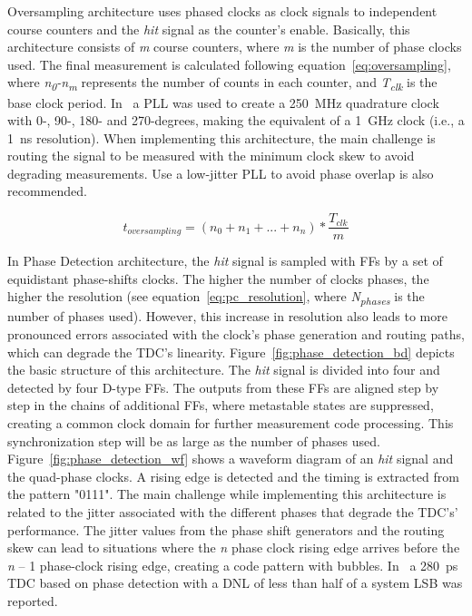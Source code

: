 Oversampling architecture uses phased clocks as clock signals to independent course counters and the \textit{hit} signal as the counter’s enable. Basically, this architecture consists of \textit{m} course counters, where \textit{m} is the number of phase clocks used. The final measurement is calculated following equation~\ref{eq:oversampling}, where \textit{n\textsubscript{0}-n\textsubscript{m}} represents the number of counts in each counter, and \textit{T\textsubscript{clk}} is the base clock period. In~\citep{oversmapling} a \gls{PLL} was used to create a 250~MHz quadrature clock with 0-, 90-, 180- and 270-degrees, making the equivalent of a 1~GHz clock (i.e., a 1~ns resolution). When implementing this architecture, the main challenge is routing the signal to be measured with the minimum clock skew to avoid degrading measurements. Use a low-jitter \gls{PLL} to avoid phase overlap is also recommended.

\begin{equation}
	t_{oversampling} = (n_{0}+n_{1}+...+n_{n}) * \frac{T_{clk}} {m}
	\label{eq:oversampling}
\end{equation}

In Phase Detection architecture, the \textit{hit} signal is sampled with \glspl{FF} by a set of equidistant phase-shifts clocks. The higher the number of clocks phases, the higher the resolution (see equation~\ref{eq:pc_resolution}, where \textit{N\textsubscript{phases}} is the number of phases used). However, this increase in resolution also leads to more pronounced errors associated with the clock's phase generation and routing paths, which can degrade the \gls{TDC}'s linearity. Figure~\ref{fig:phase_detection_bd} depicts the basic structure of this architecture. The \textit{hit} signal is divided into four and detected by four D-type \glspl{FF}. The outputs from these \glspl{FF} are aligned step by step in the chains of additional \glspl{FF}, where metastable states are suppressed, creating a common clock domain for further measurement code processing. This synchronization step will be as large as the number of phases used. Figure~\ref{fig:phase_detection_wf} shows a waveform diagram of an \textit{hit} signal and the quad-phase clocks. A rising edge is detected and the timing is extracted from the pattern "0111". The main challenge while implementing this architecture is related to the jitter associated with the different phases that degrade the \gls{TDC}'s' performance. The jitter values from the phase shift generators and the routing skew can lead to situations where the \textit{n} phase clock rising edge arrives before the \textit{n} – 1 phase-clock rising edge, creating a code pattern with bubbles. In~\citep{phase_det} a 280~ps \gls{TDC} based on phase detection with a \gls{DNL} of less than half of a system \gls{LSB} was reported.

